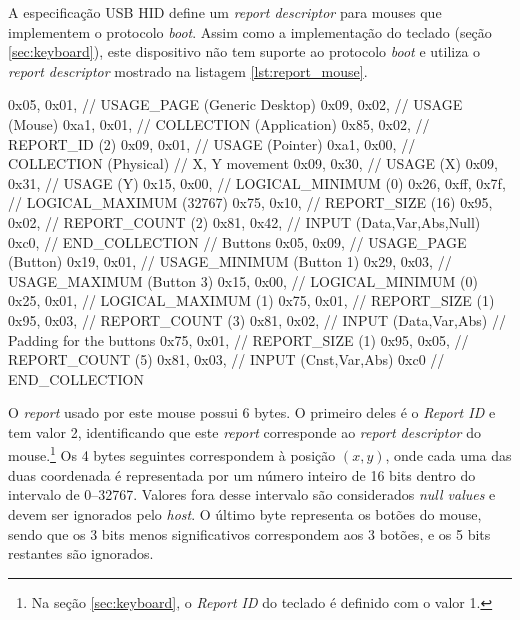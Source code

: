 \documentclass[brazil,pagestart=firstchapter]{abnt}
\begin{document}
A especificação \ac{USB} \ac{HID} define um \textit{report descriptor} para
mouses que implementem o protocolo \textit{boot}. \cite[p.~61]{usbhid} Assim
como a implementação do teclado (seção \ref{sec:keyboard}), este dispositivo
não tem suporte ao protocolo \textit{boot} e utiliza o \textit{report
descriptor} mostrado na listagem \ref{lst:report_mouse}.

\begin{ccode}[numbers=none, float=h, label={lst:report_mouse},
	caption={\textit{Report descriptor} do mouse USB}
]
	0x05, 0x01,        // USAGE_PAGE (Generic Desktop)
	0x09, 0x02,        // USAGE (Mouse)
	0xa1, 0x01,        // COLLECTION (Application)
	0x85, 0x02,	       //   REPORT_ID (2)
	0x09, 0x01,        //   USAGE (Pointer)
	0xa1, 0x00,        //   COLLECTION (Physical)
	// X, Y movement
	0x09, 0x30,        //     USAGE (X)
	0x09, 0x31,        //     USAGE (Y)
	0x15, 0x00,        //     LOGICAL_MINIMUM (0)
	0x26, 0xff, 0x7f,  //     LOGICAL_MAXIMUM (32767)
	0x75, 0x10,        //     REPORT_SIZE (16)
	0x95, 0x02,        //     REPORT_COUNT (2)
	0x81, 0x42,        //     INPUT (Data,Var,Abs,Null)
	0xc0,              //   END_COLLECTION
	// Buttons
	0x05, 0x09,        //   USAGE_PAGE (Button)
	0x19, 0x01,        //   USAGE_MINIMUM (Button 1)
	0x29, 0x03,        //   USAGE_MAXIMUM (Button 3)
	0x15, 0x00,        //   LOGICAL_MINIMUM (0)
	0x25, 0x01,        //   LOGICAL_MAXIMUM (1)
	0x75, 0x01,        //   REPORT_SIZE (1)
	0x95, 0x03,        //   REPORT_COUNT (3)
	0x81, 0x02,        //   INPUT (Data,Var,Abs)
	// Padding for the buttons
	0x75, 0x01,        //   REPORT_SIZE (1)
	0x95, 0x05,        //   REPORT_COUNT (5)
	0x81, 0x03,        //   INPUT (Cnst,Var,Abs)
	0xc0               // END_COLLECTION
\end{ccode}

O \textit{report} usado por este mouse possui 6 bytes. O primeiro deles é
o \textit{Report ID} e tem valor 2, identificando que este \textit{report}
corresponde ao \textit{report descriptor} do mouse.\footnote{
	Na seção \ref{sec:keyboard}, o \textit{Report ID} do teclado é definido
	com o valor 1.
} Os 4 bytes seguintes correspondem à posição $(x, y)$, onde cada uma das
duas coordenada é representada por um número inteiro de 16 bits dentro do
intervalo de \numrange{0}{32767}. Valores fora desse intervalo são
considerados \textit{null values} e devem ser ignorados pelo \textit{host}.
\cite[p.~20]{usbhid} O último byte representa os botões do mouse, sendo que
os 3 bits menos significativos correspondem aos 3 botões, e os 5 bits
restantes são ignorados.
\end{document}
